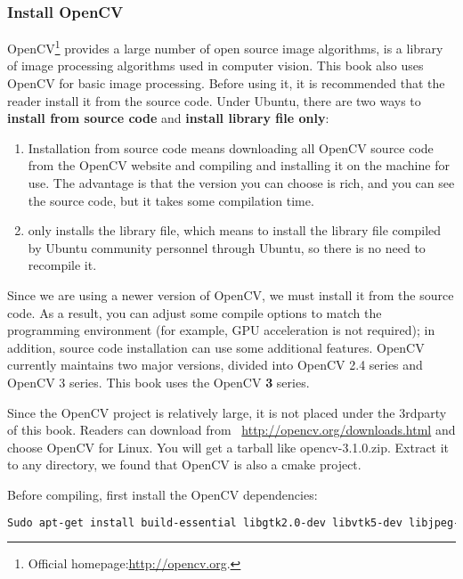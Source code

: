 \subsubsection{Install OpenCV}

OpenCV\footnote{Official homepage:\url{http://opencv.org}. } provides a large number of open source image algorithms, is a library of image processing algorithms used in computer vision. This book also uses OpenCV for basic image processing. Before using it, it is recommended that the reader install it from the source code. Under Ubuntu, there are two ways to \textbf{install from source code} and \textbf{install library file only}:

\begin{enumerate}
	\item Installation from source code means downloading all OpenCV source code from the OpenCV website and compiling and installing it on the machine for use. The advantage is that the version you can choose is rich, and you can see the source code, but it takes some compilation time.
	\item only installs the library file, which means to install the library file compiled by Ubuntu community personnel through Ubuntu, so there is no need to recompile it.
\end{enumerate}

Since we are using a newer version of OpenCV, we must install it from the source code. As a result, you can adjust some compile options to match the programming environment (for example, GPU acceleration is not required); in addition, source code installation can use some additional features. OpenCV currently maintains two major versions, divided into OpenCV 2.4 series and OpenCV 3 series. This book uses the OpenCV \textbf{3} series.

Since the OpenCV project is relatively large, it is not placed under the 3rdparty of this book. Readers can download from ~\url{http://opencv.org/downloads.html} and choose OpenCV for Linux. You will get a tarball like opencv-3.1.0.zip. Extract it to any directory, we found that OpenCV is also a cmake project.

Before compiling, first install the OpenCV dependencies:

\begin{lstlisting}[language=sh,caption=terminal input:]
Sudo apt-get install build-essential libgtk2.0-dev libvtk5-dev libjpeg-dev libtiff4-dev libjasper-dev libopenexr-dev libtbb-dev
\end{lstlisting}

